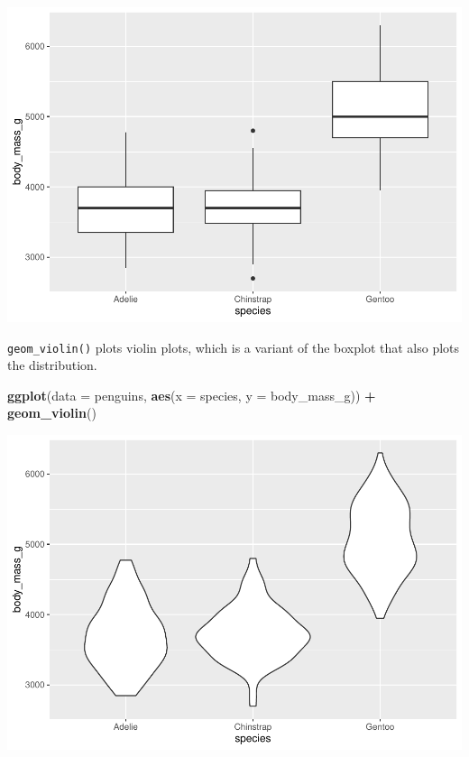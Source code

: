 \documentclass[
]{book}
\newenvironment{Shaded}{\begin{snugshade}}{\end{snugshade}}
\newcommand{\AttributeTok}[1]{\textcolor[rgb]{0.13,0.29,0.53}{#1}}
\newcommand{\FunctionTok}[1]{\textcolor[rgb]{0.13,0.29,0.53}{\textbf{#1}}}
\newcommand{\NormalTok}[1]{#1}
\newcommand{\SpecialCharTok}[1]{\textcolor[rgb]{0.81,0.36,0.00}{\textbf{#1}}}
\begin{document}
\includegraphics{_main_files/figure-latex/unnamed-chunk-54-1.pdf}

\texttt{geom\_violin()} plots violin plots, which is a variant of the boxplot that also plots the distribution.

\begin{Shaded}
\begin{Highlighting}[]
\FunctionTok{ggplot}\NormalTok{(}\AttributeTok{data =}\NormalTok{ penguins, }\FunctionTok{aes}\NormalTok{(}\AttributeTok{x =}\NormalTok{ species, }\AttributeTok{y =}\NormalTok{ body\_mass\_g)) }\SpecialCharTok{+} 
  \FunctionTok{geom\_violin}\NormalTok{()}
\end{Highlighting}
\end{Shaded}

\includegraphics{_main_files/figure-latex/unnamed-chunk-55-1.pdf}
\end{document}
